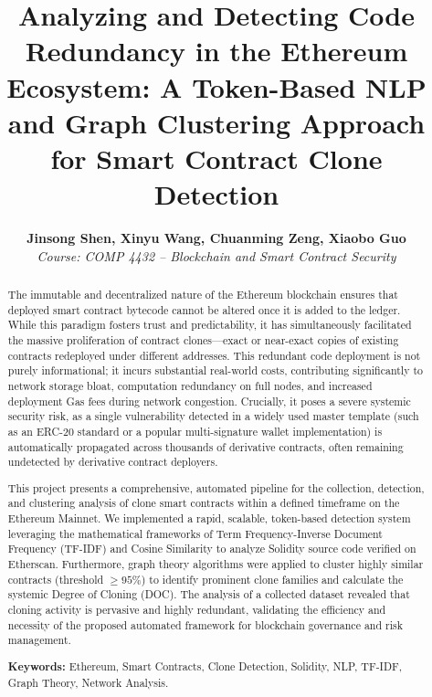 \documentclass[12pt,a4paper]{article}
\title{\vspace{-1cm} \textbf{Analyzing and Detecting Code Redundancy in the Ethereum Ecosystem: A Token-Based NLP and Graph Clustering Approach for Smart Contract Clone Detection}}
\author{
    \textbf{Jinsong Shen, Xinyu Wang, Chuanming Zeng, Xiaobo Guo} \\
    \textit{Course: COMP 4432 – Blockchain and Smart Contract Security}
}
\date{} %
\begin{document}
\sloppy %

\maketitle

\begin{abstract}
The immutable and decentralized nature of the Ethereum blockchain ensures that deployed smart contract bytecode cannot be altered once it is added to the ledger. While this paradigm fosters trust and predictability, it has simultaneously facilitated the massive proliferation of contract clones—exact or near-exact copies of existing contracts redeployed under different addresses. This redundant code deployment is not purely informational; it incurs substantial real-world costs, contributing significantly to network storage bloat, computation redundancy on full nodes, and increased deployment Gas fees during network congestion. Crucially, it poses a severe systemic security risk, as a single vulnerability detected in a widely used master template (such as an ERC-20 standard or a popular multi-signature wallet implementation) is automatically propagated across thousands of derivative contracts, often remaining undetected by derivative contract deployers. 

This project presents a comprehensive, automated pipeline for the collection, detection, and clustering analysis of clone smart contracts within a defined timeframe on the Ethereum Mainnet. We implemented a rapid, scalable, token-based detection system leveraging the mathematical frameworks of Term Frequency-Inverse Document Frequency (TF-IDF) and Cosine Similarity to analyze Solidity source code verified on Etherscan. Furthermore, graph theory algorithms were applied to cluster highly similar contracts (threshold $\ge 95\%$) to identify prominent clone families and calculate the systemic Degree of Cloning (DOC). The analysis of a collected dataset revealed that cloning activity is pervasive and highly redundant, validating the efficiency and necessity of the proposed automated framework for blockchain governance and risk management.
\vspace{0.5cm}

\noindent \textbf{Keywords:} Ethereum, Smart Contracts, Clone Detection, Solidity, NLP, TF-IDF, Graph Theory, Network Analysis.
\end{abstract}

\newpage
\tableofcontents
\newpage
\end{document}
